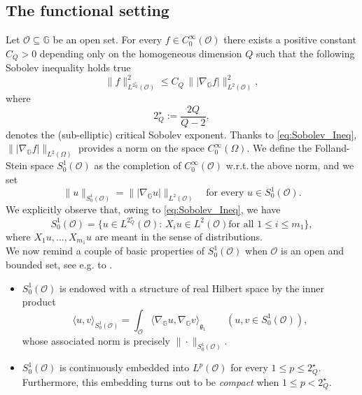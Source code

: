 \documentclass[11pt]{amsart}
\numberwithin{equation}{section} %
\theoremstyle{definition}
\begin{document}
\medskip

\subsection{The functional setting}\label{sec:functional_setting}
Let $\mathcal{O} \subseteq \mathbb{G}$ be an open set.
For every $f \in C^{\infty}_{0}(\mathcal{O})$ there exists a positive constant $C_Q>0$ depending only on the homogeneous dimension $Q$ such that the following Sobolev inequality holds true
\begin{equation}\label{eq:Sobolev_Ineq}
	\|f\|^{2}_{L^{2_{Q}^{\star}}(\mathcal{O})} \leq C_{Q} \, \| |\nabla_{\mathbb{G}}f| \|^{2}_{L^{2}(\mathcal{O})},
\end{equation}
\noindent where 
\begin{equation}
	2_{Q}^{\star} := \dfrac{2Q}{Q-2},
\end{equation}
\noindent denotes the (sub-elliptic) critical Sobolev exponent.
Thanks to \eqref{eq:Sobolev_Ineq}, 
$\| |\nabla_{\mathbb{G}}f| \|_{L^{2}(\Omega)}$ provides a norm on the space $C^{\infty}_{0}(\Omega)$.
We define the Folland-Stein space $S^{1}_{0}(\mathcal{O})$ as the completion of $C^{\infty}_{0}(\mathcal{O})$ w.r.t.\,the above norm, and we set
$$\|u\|_{S^{1}_{0}(\mathcal{O})} = \||\nabla_\mathbb{G}u|\|_{L^2(\mathcal{O})}
\quad\text{for every $u\in S^{1}_{0}(\mathcal{O})$}.$$
We explicitly observe that, owing to \eqref{eq:Sobolev_Ineq}, we have
\begin{equation} \label{eq:explicitS01def}
 S_0^1(\mathcal{O}) = \big\{u\in L^{2_{Q}^{\star}}(\mathcal{O}):\,\text{$X_iu\in L^2(\mathcal{O})$
 for all $1\leq i\leq m_1$}\big\},
\end{equation}
where $X_1u,\ldots,X_{m_1}u$ are meant in the sense of distributions.\\
We now remind a couple of basic properties of $S_0^1(\mathcal{O})$ when $\mathcal{O}$ is an open and bounded set, see e.g. to \cite{FollandStein}.
\begin{itemize}
 \item $S_0^1(\mathcal{O})$ is endowed with a structure of real Hilbert space by the inner product
 $$\langle u,v\rangle_{S_0^{1}(\mathcal{O})} = \int_{\mathcal{O}}\langle \nabla_\mathbb{G}u,
 \nabla_\mathbb{G}v\rangle_{\mathfrak{g}_{1}}\qquad (u,v\in S_0^1(\mathcal{O})),$$
whose associated norm is precisely $\|\cdot\|_{S_0^1(\mathcal{O})}$.

 \item $S_0^1(\mathcal{O})$ is continuously embedded into $L^p(\mathcal{O})$ for every $1\leq p\leq 2_Q^\star$.
 Furthermore, this embedding turns out to be \emph{compact} when $1\leq p < 2_Q^\star$. 
 \end{itemize}
\end{document}
